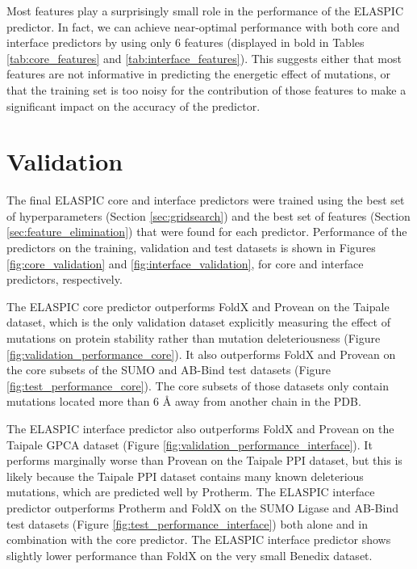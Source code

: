Most features play a surprisingly small role in the performance of the ELASPIC predictor. In fact, we can achieve near-optimal performance with both core and interface predictors by using only 6 features (displayed in bold in Tables \ref{tab:core_features} and \ref{tab:interface_features}). This suggests either that most features are not informative in predicting the energetic effect of mutations, or that the training set is too noisy for the contribution of those features to make a significant impact on the accuracy of the predictor.

\clearpage



\clearpage
\section{Validation} \label{sec:validation}

The final ELASPIC core and interface predictors were trained using the best set of hyperparameters (Section \ref{sec:gridsearch}) and the best set of features (Section \ref{sec:feature_elimination}) that were found for each predictor. Performance of the predictors on the training, validation and test datasets is shown in Figures \ref{fig:core_validation} and \ref{fig:interface_validation}, for core and interface predictors, respectively.

The ELASPIC core predictor outperforms FoldX and Provean on the Taipale dataset, which is the only validation dataset explicitly measuring the effect of mutations on protein stability rather than mutation deleteriousness (Figure \ref{fig:validation_performance_core}). It also outperforms FoldX and Provean on the core subsets of the SUMO and AB-Bind test datasets (Figure \ref{fig:test_performance_core}). The core subsets of those datasets only contain mutations located more than 6 {\AA} away from another chain in the PDB.

The ELASPIC interface predictor also outperforms FoldX and Provean on the Taipale GPCA dataset (Figure \ref{fig:validation_performance_interface}). It performs marginally worse than Provean on the Taipale PPI dataset, but this is likely because the Taipale PPI dataset contains many known deleterious mutations, which are predicted well by Protherm. The ELASPIC interface predictor outperforms Protherm and FoldX on the SUMO Ligase and AB-Bind test datasets (Figure \ref{fig:test_performance_interface}) both alone and in combination with the core predictor. The ELASPIC interface predictor shows slightly lower performance than FoldX on the very small Benedix dataset.


